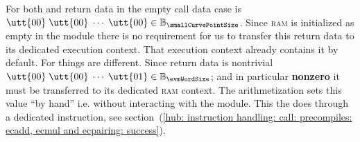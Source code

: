 \saNote{}
For both  and  return data in the empty call data case is 
$\utt{00} \;
\utt{00} \; \cdots \;
\utt{00} \in \mathbb{B}_{\smallCurvePointSize}$.
Since \textsc{ram} is initialized as empty in the \mmuMod{} module there is no requirement for us to transfer this return data to its dedicated execution context.
That execution context already contains it by default.
For  things are different.
Since return data is nontrivial
$\utt{00} \;
\utt{00} \; \cdots \;
\utt{01} \in \mathbb{B}_{\evmWordSize}$;
and in particular \textbf{nonzero} it must be transferred to its dedicated \textsc{ram} context.
The arithmetization sets this value ``by hand'' i.e. without interacting with the \ecDataMod{} module.
This the \zkEvm{} does through a dedicated \mmuInstMstore{} instruction, see section~(\ref{hub: instruction handling: call: precompiles: ecadd, ecmul and ecpairing: success}).

